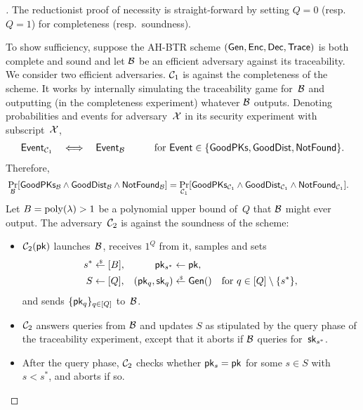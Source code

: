 \begin{proof}[]
The reductionist proof of necessity is straight-forward by setting ${Q=0}$ (resp.~${Q=1}$) for completeness (resp.~soundness).

To show sufficiency, suppose the AH-BTR scheme $(\Gen,\Enc,\Dec,\Trace)$ is both complete and sound and let ${\mathcal{B}}$ be an efficient adversary against its traceability.
We consider two efficient adversaries.
${\mathcal{C}}_1$ is against the completeness of the scheme.
It works by internally simulating the traceability game for~${\mathcal{B}}$ and outputting (in the completeness experiment) whatever ${\mathcal{B}}$ outputs.
Denoting probabilities and events for adversary~${\mathcal{X}}$ in its security experiment with subscript~${\mathcal{X}}$,
\begin{align*}
\mathsf{Event}_{\scriptC_1}
\quad\Longleftrightarrow\quad
\mathsf{Event}_\scriptB
\quad\qquad
\textup{for }\mathsf{Event}\in{\{\GoodPKs,\GoodDist,\NotFound\}}.
\end{align*}
Therefore,
\begin{align*}
&\Pr_\scriptB[\GoodPKs_\scriptB\wedge\GoodDist_\scriptB\wedge\NotFound_\scriptB]
\WideNarrow{}{\\&\qquad{}}=
\Pr_{\scriptC_1}
[\GoodPKs_{\scriptC_1}\wedge\GoodDist_{\scriptC_1}\wedge\NotFound_{\scriptC_1}].
\end{align*}
Let ${B=\operatorname{poly}(\lambda)>1}$ be a polynomial upper bound of~$Q$ that ${\mathcal{B}}$ might ever output.
The adversary~${\mathcal{C}}_2$ is against the soundness of the scheme:
\begin{itemize}
\item $\scriptC_2(\pk)$ launches~${\mathcal{B}}$, receives $1^Q$ from it,
samples and sets
\begin{align*}
s^\ast&{}\draws[B],&
\pk_{s^\ast}&{}\gets\pk,\\
S&{}\gets[Q],&
(\pk_q,\sk_q)&{}\draws\Gen()\quad\textup{for }q\in{[Q]\setminus{\{s^\ast\}}},
\end{align*}
and sends $\{\pk_q\}_{q\in[Q]}$ to~${\mathcal{B}}$.
\item ${\mathcal{C}}_2$ answers queries from ${\mathcal{B}}$ and updates $S$ as stipulated by the query phase of the traceability experiment, except that it aborts if ${\mathcal{B}}$ queries for~$\sk_{s^\ast}$.
\item After the query phase,
${\mathcal{C}}_2$ checks whether ${\pk_s=\pk}$ for some ${s\in S}$ with ${s<s^\ast}$,
and aborts if so.

\end{itemize}
\end{proof}
